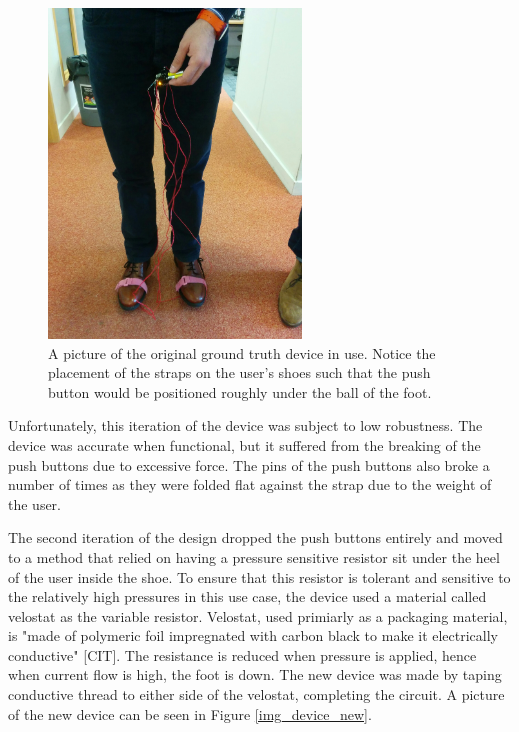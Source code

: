             \begin{figure}[!th]
                \includegraphics[width=0.6\textwidth]{Images/device_og_use.jpg}
                \centering
                \caption{A picture of the original ground truth device in use. Notice the placement of the straps on the user's shoes such that the push button would be positioned roughly under the ball of the foot.}
                \label{img_device_og_use}
            \end{figure}

            Unfortunately, this iteration of the device was subject to low robustness. The device was accurate when functional, but it suffered from the breaking of the push buttons due to excessive force. The pins of the push buttons also broke a number of times as they were folded flat against the strap due to the weight of the user.

            The second iteration of the design dropped the push buttons entirely and moved to a method that relied on having a pressure sensitive resistor sit under the heel of the user inside the shoe. To ensure that this resistor is tolerant and sensitive to the relatively high pressures in this use case, the device used a material called velostat as the variable resistor. Velostat, used primiarly as a packaging material, is "made of polymeric foil impregnated with carbon black to make it electrically conductive" [CIT]. The resistance is reduced when pressure is applied, hence when current flow is high, the foot is down. The new device was made by taping conductive thread to either side of the velostat, completing the circuit. A picture of the new device can be seen in Figure \ref{img_device_new}.

